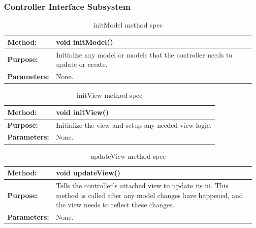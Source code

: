 \documentclass[12pt]{article}
\begin{document}
\subsubsection{Controller Interface Subsystem}

\begin{table}[H]
  \caption{initModel method spec}
  \begin{center}
    \begin{tabular}{|l|p{10cm}|}
      \hline
      \bf Method: & void initModel()\\
		\hline
      \bf Purpose: & Initialize any model or models that the controller needs to update or create.\\
		\hline
      \bf Parameters: & None.\\
		\hline
    \end{tabular}
  \end{center}
\end{table}

\begin{table}[H]
  \caption{initView method spec}
  \begin{center}
    \begin{tabular}{|l|p{10cm}|}
      \hline
      \bf Method: & void initView()\\
		\hline
      \bf Purpose: &  Initialize the view and setup any needed view logic.\\
		\hline
      \bf Parameters: & None.\\
		\hline
    \end{tabular}
  \end{center}
\end{table}

\begin{table}[H]
  \caption{updateView method spec}
  \begin{center}
    \begin{tabular}{|l|p{10cm}|}
      \hline
      \bf Method: & void updateView()\\
		\hline
      \bf Purpose: & Tells the controller's attached view to update its ui. This method is called after any model changes have happened, and the view needs to reflect these changes.\\
		\hline
      \bf Parameters: & None.\\
		\hline
    \end{tabular}
  \end{center}
\end{table}
\end{document}
